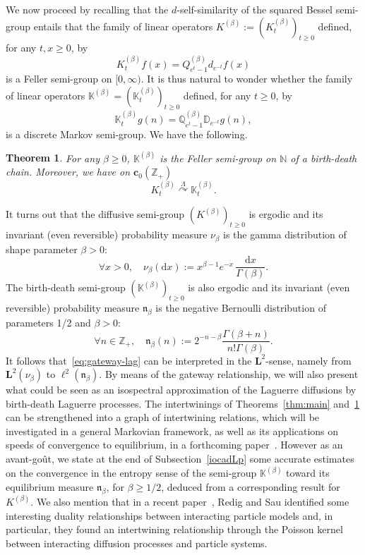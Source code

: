 \documentclass[10pt]{amsart}
\newtheorem{theo}{Theorem}[section]
\theoremstyle{definition}\newtheorem{defi}[theo]{Definition}\newtheorem{rema}[theo]{Remark}\newtheorem{exam}[theo]{Example}\newtheorem{exem}[theo]{Example}\newtheorem{nota}[theo]{Notation}
\newcommand{\df}{\mathrel{:=}}
\newcommand{\ZZ}{\mathbb{Z}}
\newcommand{\fn}{\mathfrak{n}}
\newcommand{\dLs}{{\discret{K}}}
\newcommand{\Ls}{K}
\newcommand{\esL}{\mathbf{L}}
\newcommand{\esc}{\mathbf{c}}
\newcommand*\N{{\mathbb N}}
\newcommand{\discret}[1]{\mathds{#1}}
\newcommand{\cont}[1]{{#1}}
\newcommand{\Gate}[3]{#1\stackrel{#2}{\curvearrowright}#3}
\let\oldforall\forall
\renewcommand*{\forall}{\mathrel{\oldforall}}
\newcommand*{\dd}{\mathrm{d}}
\newcommand*{\dx}{\dd x}
\begin{document}
We now proceed by recalling that the $\cont{d}$-self-similarity of the squared Bessel semi-group entails that the family of linear operators $\cont{K}^{(\beta)}\df(\cont{K}^{(\beta)}_t)_{t\geq 0}$ defined, for any $t,x\geq 0$, by
\begin{equation*}
\cont{K}^{(\beta)}_t f(x) = \cont{Q}^{(\beta)}_{e^t-1} \cont{d}_{e^{-t}}f(x)
\end{equation*}
is a Feller semi-group on $[0,\infty)$. It is thus natural to wonder whether the family of linear operators $\discret{K}^{(\beta)}=(\discret{K}^{(\beta)}_t)_{t\geq 0}$ defined, for any $t\geq 0$, by
\begin{equation*}
\discret{K}^{(\beta)}_t g(n) = \discret{Q}^{(\beta)}_{e^t-1} \discret{D}_{e^{-t}}g(n),
\end{equation*}
is a discrete Markov semi-group. We have the following.


\begin{theo}\label{thm:mainK}
For any $\beta\geq 0$, $\discret{K}^{(\beta)}$ is the Feller semi-group on $\N$ of a birth-death chain. Moreover, we have on $\esc_0(\ZZ_+)$
\begin{equation}\label{eq:gateway-lag}
\Gate{\cont{K}_t^{(\beta)}}{\Lambda}{\discret{K}_t^{(\beta)}}.
\end{equation}
\end{theo}


It turns out that the diffusive semi-group $(\Ls^{(\beta)})_{t\geq 0}$ is ergodic and its invariant (even reversible) probability measure $\nu_\beta$ is the gamma distribution of shape parameter $\beta>0$:
\[
\forall x>0,\quad\nu_\beta(\dx)\df x^{\beta-1}e^{-x}\, \frac{\dx}{\Gamma(\beta)}.
\]
The birth-death semi-group $(\dLs^{(\beta)})_{t\geq 0}$ is also ergodic and its invariant (even reversible) probability measure $\fn_\beta$ is the negative Bernoulli distribution of parameters 1/2 and $\beta>0$:
\[
\forall n\in\ZZ_+,\quad \fn_\beta(n)\df 2^{-n-\beta}\frac{\Gamma(\beta+n)}{n!\Gamma(\beta)}.
\]
It follows that~\eqref{eq:gateway-lag} can be interpreted in the $\esL^2$-sense, namely from $\esL^2(\nu_\beta)$ to $\ell^2(\fn_\beta)$. By means of the gateway relationship, we will also present what could be seen as an isospectral approximation of the Laguerre diffusions by birth-death Laguerre processes. The intertwinings of Theorems~\ref{thm:main} and~\ref{thm:mainK} can be strengthened into a graph of intertwining relations, which will be investigated in a general Markovian framework, as well as its applications on speeds of convergence to equilibrium, in a forthcoming paper~\cite{intertwining}. However as an avant-go\^ut, we state at the end of Subsection~\ref{iocadLp} some accurate estimates on the convergence in the entropy sense of the semi-group $\dLs^{(\beta)}$ toward its equilibrium measure $\fn_\beta$, for $\beta\geq 1/2$, deduced from a corresponding result for $\Ls^{(\beta)}$. We also mention that in a recent paper~\cite{Redig}, Redig and Sau identified some interesting duality relationships between interacting particle models and, in particular, they found an intertwining relationship through the Poisson kernel between interacting diffusion processes and particle systems.
\end{document}
